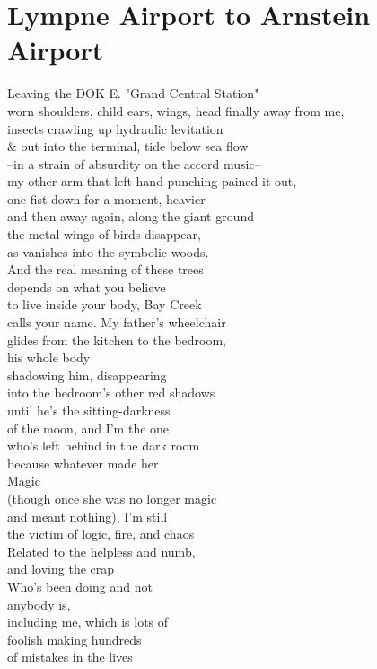 \documentclass[smalldemyvopaper,11pt,twoside,onecolumn,openright,extrafontsizes]{memoir}
\begin{document}
\chapter{Lympne Airport to Arnstein Airport}
Leaving the DOK E. "Grand Central Station"
\\worn shoulders, child ears, wings, head finally away from me,
\\insects crawling up hydraulic levitation
\\\& out into the terminal, tide below sea flow
\\--in a strain of absurdity on the accord music--
\\my other arm that left hand punching pained it out,
\\one fist down for a moment, heavier
\\and then away again, along the giant ground
\\the metal wings of birds disappear,
\\as vanishes into the symbolic woods.
\\And the real meaning of these trees
\\depends on what you believe
\\to live inside your body, Bay Creek
\\calls your name. My father's wheelchair
\\glides from the kitchen to the bedroom,
\\his whole body
\\shadowing him, disappearing
\\into the bedroom's other red shadows
\\until he's the sitting-darkness
\\of the moon, and I'm the one
\\who's left behind in the dark room
\\because whatever made her
\\Magic
\\(though once she was no longer magic
\\and meant nothing), I'm still
\\the victim of logic, fire, and chaos
\\Related to the helpless and numb,
\\and loving the crap
\\Who's been doing and not
\\anybody is,
\\including me, which is lots of
\\foolish making hundreds
\\of mistakes in the lives
\end{document}
